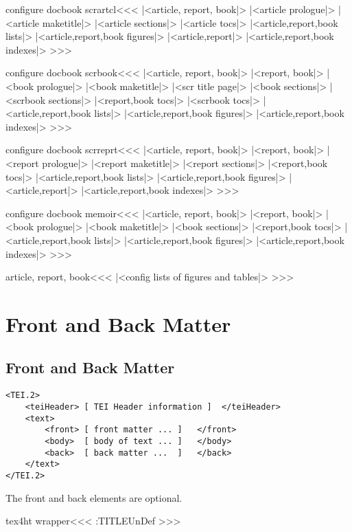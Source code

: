 \<configure docbook scrartcl\><<< 
|<article, report, book|>
|<article prologue|>
|<article maketitle|>
|<article sections|>
|<article tocs|>
|<article,report,book lists|>
|<article,report,book figures|>
|<article,report|>
|<article,report,book indexes|>
>>>

\<configure docbook scrbook\><<< 
|<article, report, book|>
|<report, book|>
|<book prologue|>
|<book maketitle|>
|<scr title page|>
|<book sections|>
|<scrbook sections|>
|<report,book tocs|>
|<scrbook tocs|>
|<article,report,book lists|>
|<article,report,book figures|>
|<article,report,book indexes|>
>>>

\<configure docbook scrreprt\><<< 
|<article, report, book|>
|<report, book|>
|<report prologue|>
|<report maketitle|>
|<report sections|>
|<report,book tocs|>
|<article,report,book lists|>
|<article,report,book figures|>
|<article,report|>
|<article,report,book indexes|>
>>>

\<configure docbook memoir\><<< 
|<article, report, book|>
|<report, book|>
|<book prologue|>
|<book maketitle|>
|<book sections|>
|<report,book tocs|>
|<article,report,book lists|>
|<article,report,book figures|>
|<article,report,book indexes|>
>>>

\<article, report, book\><<<
|<config lists of figures and tables|>
>>>

\chapter{Front and Back Matter}



\section{Front and Back Matter}



\begin{verbatim}
<TEI.2>
    <teiHeader> [ TEI Header information ]  </teiHeader>
    <text>
        <front> [ front matter ... ]   </front>
        <body>  [ body of text ... ]   </body>
        <back>  [ back matter ...  ]   </back>
    </text>
</TEI.2>
\end{verbatim}

The front and back elements are optional.

\<tex4ht wrapper\><<<
 {}
\ifx \a:TITLE\:UnDef
\fi
>>>


